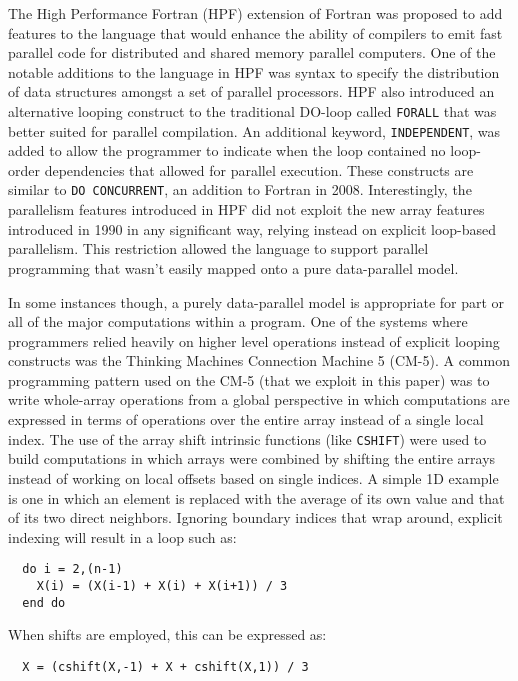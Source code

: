 The High Performance Fortran (HPF) extension of Fortran was proposed to add
features to the language that would enhance the ability of compilers to emit
fast parallel code for distributed and shared memory parallel
computers\cite{koelbel94hpf}.  One of the notable additions to the language in
HPF was syntax to specify the distribution of data structures amongst a set of
parallel processors.  HPF also introduced an alternative looping construct to
the traditional DO-loop called {\tt FORALL} that was better suited for parallel
compilation.  An additional keyword, {\tt INDEPENDENT}, was added to allow the
programmer to indicate when the loop contained no loop-order dependencies that
allowed for parallel execution.  These constructs are similar to {\tt DO
  CONCURRENT}, an addition to Fortran in 2008.  Interestingly, the parallelism
features introduced in HPF did not exploit the new array features introduced in
1990 in any significant way, relying instead on explicit loop-based parallelism.
This restriction allowed the language to support parallel programming that
wasn't easily mapped onto a pure data-parallel model.

In some instances though, a purely data-parallel model is appropriate for part
or all of the major computations within a program.  One of the systems where
programmers relied heavily on higher level operations instead of explicit
looping constructs was the Thinking Machines Connection Machine 5 (CM-5).  A
common programming pattern used on the CM-5 (that we exploit in this paper) was to
write whole-array operations from a global perspective in which computations are
expressed in terms of operations over the entire array instead of a single local
index.  The use of the array shift intrinsic functions (like {\tt CSHIFT}) were
used to build computations in which arrays were combined by shifting the entire
arrays instead of working on local offsets based on single indices.  A simple
1D example is one in which an element is replaced with the average of its own
value and that of its two direct neighbors.  Ignoring boundary indices that
wrap around, explicit indexing will result in a loop such as:

{\small
\begin{verbatim}
  do i = 2,(n-1)
    X(i) = (X(i-1) + X(i) + X(i+1)) / 3
  end do
\end{verbatim}
}

\noindent When shifts are employed, this can be expressed as:

{\small
\begin{verbatim}
  X = (cshift(X,-1) + X + cshift(X,1)) / 3
\end{verbatim}
}

